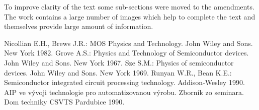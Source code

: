 \par To improve clarity of the text some sub-sections were moved to
the amendments. The work contains a large number of images which help
to complete the text and themselves provide large amount of
information.

\begin{thebibliography}{}
 Nicollian E.H., Brews J.R.: MOS Physics and
  Technology. John Wiley and Sons. New York 1982.
 Grove A.S.: Physics and Technology of Semiconductor
  devices. John Wiley and Sons. New York 1967.
 Sze S.M.: Physics of semiconductor devices. John
  Wiley and Sons. New York 1969.
 Runyan W.R., Bean K.E.: Semiconductor integrated
  circuit processing technology. Addison-Wesley 1990.
 AIP ve vývoji technologie pro automatizovanou
  výrobu. Zborník zo seminara. Dom techniky CSVTS Pardubice 1990.
\end{thebibliography}
